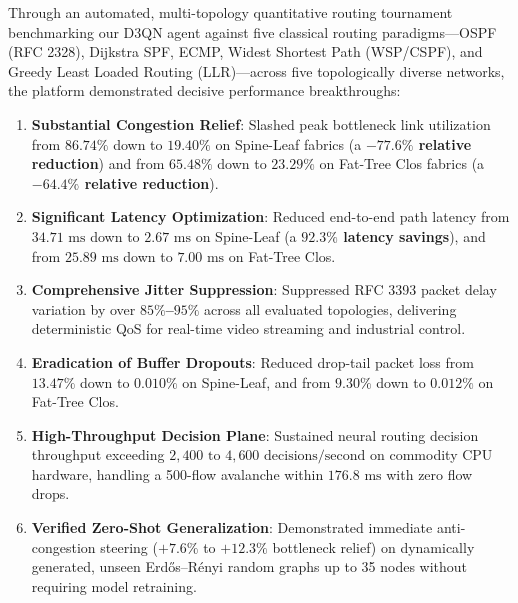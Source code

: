 \documentclass[12pt,a4paper,oneside]{report}
\begin{document}
Through an automated, multi-topology quantitative routing tournament benchmarking our D3QN agent against five classical routing paradigms---OSPF (RFC 2328), Dijkstra SPF, ECMP, Widest Shortest Path (WSP/CSPF), and Greedy Least Loaded Routing (LLR)---across five topologically diverse networks, the platform demonstrated decisive performance breakthroughs:
\begin{enumerate}
    \item \textbf{Substantial Congestion Relief}: Slashed peak bottleneck link utilization from $86.74\%$ down to \textbf{$19.40\%$} on Spine-Leaf fabrics (a \textbf{$-77.6\%$ relative reduction}) and from $65.48\%$ down to \textbf{$23.29\%$} on Fat-Tree Clos fabrics (a \textbf{$-64.4\%$ relative reduction}).
    \item \textbf{Significant Latency Optimization}: Reduced end-to-end path latency from $34.71\text{ ms}$ down to \textbf{$2.67\text{ ms}$} on Spine-Leaf (a \textbf{$92.3\%$ latency savings}), and from $25.89\text{ ms}$ down to \textbf{$7.00\text{ ms}$} on Fat-Tree Clos.
    \item \textbf{Comprehensive Jitter Suppression}: Suppressed RFC 3393 packet delay variation by over \textbf{$85\%$--$95\%$} across all evaluated topologies, delivering deterministic QoS for real-time video streaming and industrial control.
    \item \textbf{Eradication of Buffer Dropouts}: Reduced drop-tail packet loss from $13.47\%$ down to \textbf{$0.010\%$} on Spine-Leaf, and from $9.30\%$ down to \textbf{$0.012\%$} on Fat-Tree Clos.
    \item \textbf{High-Throughput Decision Plane}: Sustained neural routing decision throughput exceeding \textbf{$2,400\text{ to } 4,600\text{ decisions/second}$} on commodity CPU hardware, handling a 500-flow avalanche within $176.8\text{ ms}$ with zero flow drops.
    \item \textbf{Verified Zero-Shot Generalization}: Demonstrated immediate anti-congestion steering ($+7.6\%$ to $+12.3\%$ bottleneck relief) on dynamically generated, unseen Erd\H{o}s--R\'enyi random graphs up to 35 nodes without requiring model retraining.
\end{enumerate}
\end{document}
